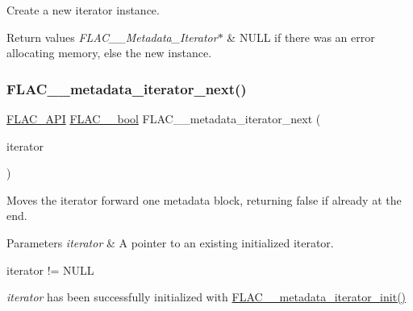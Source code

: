 Create a new iterator instance.


\begin{DoxyRetVals}{Return values}
{\em F\+L\+A\+C\+\_\+\+\_\+\+Metadata\+\_\+\+Iterator$\ast$} & {\ttfamily N\+U\+LL} if there was an error allocating memory, else the new instance. \\
\hline
\end{DoxyRetVals}
\mbox{\label{group__flac__metadata__level2_ga3997509ae7eeea3b208700cdbbbd97ed}} 
\subsubsection{\texorpdfstring{F\+L\+A\+C\+\_\+\+\_\+metadata\+\_\+iterator\+\_\+next()}{FLAC\_\_metadata\_iterator\_next()}}
{\footnotesize\ttfamily \hyperlink{group__flac__export_ga56ca07df8a23310707732b1c0007d6f5}{F\+L\+A\+C\+\_\+\+A\+PI} \hyperlink{ordinals_8h_a95103469f1cbd78b8cf250194985b34e}{F\+L\+A\+C\+\_\+\+\_\+bool} F\+L\+A\+C\+\_\+\+\_\+metadata\+\_\+iterator\+\_\+next (\begin{DoxyParamCaption}\item[{\hyperlink{group__flac__metadata__level2_ga9f3e135a07cdef7e51597646aa7b89b2}{F\+L\+A\+C\+\_\+\+\_\+\+Metadata\+\_\+\+Iterator} $\ast$}]{iterator }\end{DoxyParamCaption})}

Moves the iterator forward one metadata block, returning {\ttfamily false} if already at the end.


\begin{DoxyParams}{Parameters}
{\em iterator} & A pointer to an existing initialized iterator.  
\begin{DoxyCode}
iterator != NULL 
\end{DoxyCode}
 {\itshape iterator} has been successfully initialized with \hyperlink{group__flac__metadata__level2_ga4a5af69a1f19436b02f738eb8c97c959}{F\+L\+A\+C\+\_\+\+\_\+metadata\+\_\+iterator\+\_\+init()} \\
\hline
\end{DoxyParams}

